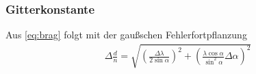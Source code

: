 \subsubsection{Gitterkonstante}
Aus \eqref{eq:brag} folgt mit der gaußschen Fehlerfortpflanzung
\begin{align}
	\Delta \frac{d}{n} = \sqrt{\left(\frac{\Delta \lambda}{2\sin\alpha}\right)^2 + \left(\frac{\lambda\cos\alpha}{\sin^2\alpha} \Delta\alpha \right)^2}
\end{align}
%
%
